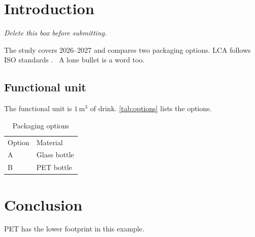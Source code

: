 \documentclass[11pt]{article}
\newcommand{\guidance}[1]{\par\noindent\colorbox{blue!10}{\parbox{\linewidth}{\itshape #1}}\par}
\begin{document}
\tableofcontents

\section{Introduction}

\guidance{Delete this box before submitting.}

The study covers 2026--2027 and compares two packaging options.
LCA follows ISO standards \cite{debruijnHandbookLifeCycle2002a}.
\textbullet\ A lone bullet is a word too.

\subsection{Functional unit}

The functional unit is $1\,\mathrm{m^3}$ of drink.
\autoref{tab:options} lists the options.

\begin{table}[h]
  \caption{Packaging options}
  \label{tab:options}
  \begin{tabular}{ll}
    \hline
    Option & Material \\
    A & Glass bottle \\
    B & PET bottle \\
    \hline
  \end{tabular}
\end{table}

\section{Conclusion}

PET has the lower footprint in this example.

\printbibliography
\end{document}
